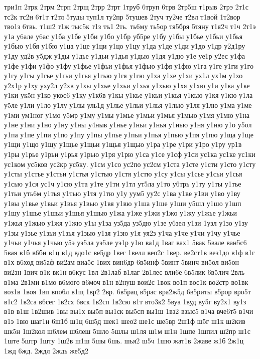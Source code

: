 {три1п
2трк
2трм
2трп
2трщ
2трр
2трт
1труб
6труп
6трв
2тр5ш
т1рыв
2трэ
2т1с
тс2к
тс2н
6т1т
т2тл
5туды
туп1л
ту2пр
5тушев
2туч
ту2че
т2вл
т1вой
1т2вор
тво1з
6твь.
т1ш2
т1ж
тыс5к
т1з
тъ1
2ть.
ть6му
ть5ор
тя5бря
5тяну
т1я2ч
т1ч
2т1э
у1а
у6але
у6ас
у1ба
у1бе
у1би
у1бо
у1бр
уб5ре
у1бу
у1бы
у1бье
у1бьи
у1бья
у1бью
у1бя
у1бю
у1ца
у1це
у1ци
у1цо
у1цу
у1да
у1де
у1ди
у1до
у1др
у2д1ру
у1ду
уд2в
у5дж
у1ды
у1дье
у1дьи
у1дья
у1дью
у1дя
у1дю
у1е
уе1р
у2ес
у1фа
у1фе
у1фи
у1фо
у1фу
у1фье
у1фьи
у1фья
у1фью
у1фя
у1фю
у1га
у1ге
у1ги
у1го
у1гу
у1гы
у1гье
у1гьи
у1гья
у1гью
у1гя
у1гю
у1ха
у1хе
у1хи
ух1л
ух1м
у1хо
у2х1р
у1ху
уху2л
у2хв
у1хы
у1хье
у1хьи
у1хья
у1хью
у1хя
у1хю
у1и
у1ка
у1ке
у1ки
ук5н
у1ко
укос6
у1ку
у1к6в
у1кы
у1кье
у1кьи
у1кья
у1кью
у1кя
у1кю
у1ла
у5ле
у1ли
у1ло
у1лу
у1лы
уль1д
у1лье
у1льи
у1лья
у1лью
у1ля
у1лю
у1ма
у1ме
у1ми
ум1ног
у1мо
у5мр
у1му
у1мы
у1мье
у1мьи
у1мья
у1мью
у1мя
у1мю
у1на
у1не
у1ни
у1но
у1ну
у1ны
у4ныв
у1нье
у1ньи
у1нья
у1нью
у1ня
у1ню
у1о
у5ол
у1па
у1пе
у1пи
у1по
у1пу
у1пы
у1пье
у1пьи
у1пья
у1пью
у1пя
у1пю
у1ща
у1ще
у1щи
у1що
у1щу
у1щье
у1щьи
у1щья
у1щью
у1ра
у1ре
у1ри
у1ро
у1ру
ур1в
у1ры
у1рье
у1рьи
у1рья
у1рью
у1ря
у1рю
у1са
у1се
у1сф
у1си
ус1ка
ус1ке
ус1ки
ус1ком
ус5ков
ус2кр
ус5ку.
у1см
у1со
ус2по
ус2см
у1ста
у1сте
у1сти
у1сто
у1сту
у1сты
у1стье
у1стьи
у1стья
у1стью
у1стя
у1стю
у1су
у1сы
у1сье
у1сьи
у1сья
у1сью
у1ся
ус1ч
у1сю
у1та
у1те
у1ти
у1тл
ут5ла
у1то
у6трь
у1ту
у1ты
у1тье
у1тьи
уть6м
у1тья
у1тью
у1тя
у1тю
у1у
уум5
уу2с
у1ва
у1ве
у1ви
у1во
у1ву
у1вы
у1вье
у1вьи
у1вья
у1вью
у1вя
у1вю
у1ша
у1ше
у1ши
у5шл
у1шо
у1шп
у1шу
у1шье
у1шьи
у1шья
у1шью
у1жа
у1же
у1жи
у1жо
у1жу
у1жье
у1жьи
у1жья
у1жью
у1жя
у1жю
у1ы
у1за
уз5да
уз5дю
у1зе
у6зел
у1зи
1узл
у1зо
у1зу
у1зы
у1зье
у1зьи
у1зья
у1зью
у1зя
у1зю
у1я
уя2з
у1ча
у1че
у1чи
у1чу
у1чье
у1чьи
у1чья
у1чью
у5э
уэ5ла
уэ5ле
уэ1р
у1ю
ва1д
1ваг
вах1
5вак
5вале
ван5с6
5вая
в1б
в6би
в1ц
в1д
вдо1с
ве5др
1вег
1велл
вео2с
1вер.
ве2ст1в
вез1до
в1ф
в1г
в1х
в6ход
ви5аф
ви2ам
виа5с
1вих
вин6др
6в5инф
5винт
5винч
ви5ол
ви5он
ви2зн
1вич
в1к
вк1н
в6кус
1вл
2в1лаб
в1лаг
2в1лес
вли6е
6в5лик
6в5лич
2вль
в1ма
2в1ми
в1мо
в6мого
в6моч
в1н
в2нуш
вои2с
1вок
во1п
вос1к
во2стр
во1вк
воз1в
1воя
1вп
впо6л
в1щ
1вр2
2вр.
6в5рац
в5рас
вра2ж5д
6в5риты
в5рор
вро5т
в1с2
1в2са
в6сег
1в2сх
6вск
1в2сп
1в2сю
в1т
вто3к2
5вуа
1вуд
ву5г
ву2х1
ву1з
в1в
в1ш
1в2шив
1вы
вы1х
вы5п
вы1ск
вы5сп
вы1ш
1вз2
взыс5
в1ча
вче6т5
в1чи
в1э
1вю
шаг1н
6ш1б
ш1ц
6ш5д
шек1
шео2
ше1с
ше5вр
2ш1ф
ш5г
ш1к
ш2кив
шк5н
1ш2кол
ш6лем
ш6леш
5шло
5шлы
ш1ля
ш1м
ш1н
1шпе
1шпил
ш2пр
ш1с
1ште
5штр
1шту
1ш2в
ш1ш
5шы
6шь.
шья2
ш5ч
1шю
жат1в
2жаве
ж1б
2ж1ц
1жд
6жд.
2ждл
2ждь
же5д2
}
